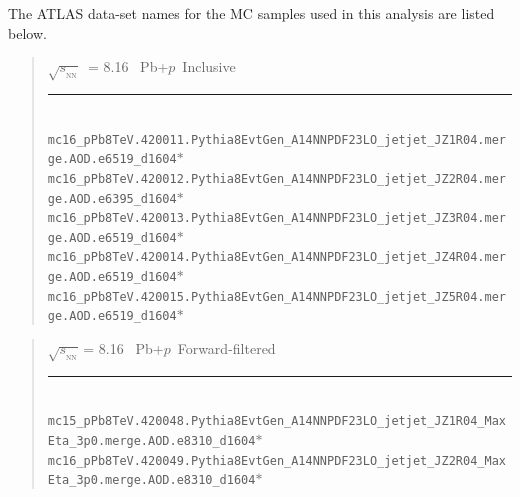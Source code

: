 \documentclass[NOTE, atlasdraft=true, texlive=2020, UKenglish]{atlasdoc}
\newcommand{\SNN}{\ensuremath{\sqrt{s_{_\text{NN}}}}}
\newcommand{\Pbxp}{Pb+$p$}
\begin{document}
The ATLAS data-set names for the MC samples used in this analysis are listed below.
\vspace{1.25cm}
\begin{quote}
\SNN\ = 8.16 \TeV\ \Pbxp\ Inclusive\\
\noindent\rule{12cm}{0.4pt}\\
{\scriptsize
    \texttt{mc16\_pPb8TeV.420011.Pythia8EvtGen\_A14NNPDF23LO\_jetjet\_JZ1R04.merge.AOD.e6519\_d1604$*$}\\
    \texttt{mc16\_pPb8TeV.420012.Pythia8EvtGen\_A14NNPDF23LO\_jetjet\_JZ2R04.merge.AOD.e6395\_d1604$*$}\\
    \texttt{mc16\_pPb8TeV.420013.Pythia8EvtGen\_A14NNPDF23LO\_jetjet\_JZ3R04.merge.AOD.e6519\_d1604$*$}\\
    \texttt{mc16\_pPb8TeV.420014.Pythia8EvtGen\_A14NNPDF23LO\_jetjet\_JZ4R04.merge.AOD.e6519\_d1604$*$}\\
    \texttt{mc16\_pPb8TeV.420015.Pythia8EvtGen\_A14NNPDF23LO\_jetjet\_JZ5R04.merge.AOD.e6519\_d1604$*$}\\
}
\end{quote}
\begin{quote}
\SNN\,= 8.16 \TeV\ \Pbxp\, Forward-filtered\\
\noindent\rule{12cm}{0.4pt}\\
{\scriptsize                    
    \texttt{mc15\_pPb8TeV.420048.Pythia8EvtGen\_A14NNPDF23LO\_jetjet\_JZ1R04\_MaxEta\_3p0.merge.AOD.e8310\_d1604$*$}\\ \texttt{mc16\_pPb8TeV.420049.Pythia8EvtGen\_A14NNPDF23LO\_jetjet\_JZ2R04\_MaxEta\_3p0.merge.AOD.e8310\_d1604$*$}\\
}
\end{quote}
\end{document}
